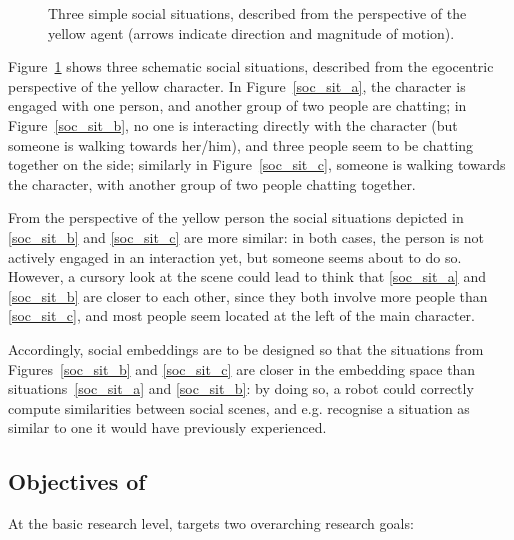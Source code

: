 \begin{figure}[ht!]
        \caption{Three simple social situations, described
        from the perspective of the yellow agent (arrows indicate direction and
        magnitude of motion).}
        \label{fig:social-situations}
\end{figure}


Figure~\ref{fig:social-situations} shows three schematic social situations,
described from the egocentric perspective of the yellow character. In
Figure~\ref{soc_sit_a}, the character is engaged with one person, and another
group of two people are chatting; in Figure~\ref{soc_sit_b}, no one is
interacting directly with the character (but someone is walking towards
her/him), and three people seem to be chatting
together on the side; similarly in Figure~\ref{soc_sit_c}, someone is walking
towards the character, with another group of two people chatting together.

From the perspective of the yellow person the social situations depicted in \ref{soc_sit_b} and \ref{soc_sit_c}
are more similar: in both cases, the person is not actively engaged in an
interaction yet, but someone seems about to do so. However, a cursory
look at the scene could lead to think that \ref{soc_sit_a} and
\ref{soc_sit_b} are closer to each other, since they both involve more people
than \ref{soc_sit_c}, and most people seem located at the left of the main
character.

Accordingly, social embeddings are to be designed so that the situations from
Figures~\ref{soc_sit_b} and \ref{soc_sit_c} are closer in the embedding space
than situations~\ref{soc_sit_a} and \ref{soc_sit_b}: by doing so, a robot could
correctly compute similarities between social scenes, and e.g. recognise a
situation as similar to one it would have previously experienced.


\subsection{Objectives of \project}


At the basic research level, \project targets two overarching research goals:

